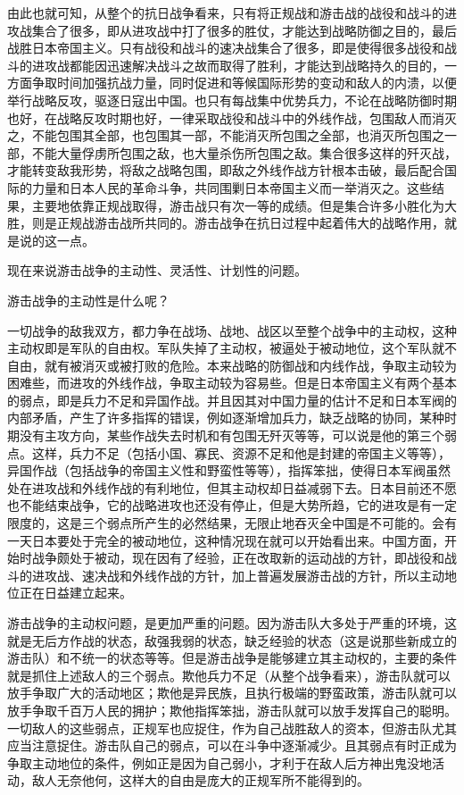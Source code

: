 由此也就可知，从整个的抗日战争看来，只有将正规战和游击战的战役和战斗的进攻战集合了很多，即从进攻战中打了很多的胜仗，才能达到战略防御之目的，最后战胜日本帝国主义。只有战役和战斗的速决战集合了很多，即是使得很多战役和战斗的进攻战都能因迅速解决战斗之故而取得了胜利，才能达到战略持久的目的，一方面争取时间加强抗战力量，同时促进和等候国际形势的变动和敌人的内溃，以便举行战略反攻，驱逐日寇出中国。也只有每战集中优势兵力，不论在战略防御时期也好，在战略反攻时期也好，一律采取战役和战斗中的外线作战，包围敌人而消灭之，不能包围其全部，也包围其一部，不能消灭所包围之全部，也消灭所包围之一部，不能大量俘虏所包围之敌，也大量杀伤所包围之敌。集合很多这样的歼灭战，才能转变敌我形势，将敌之战略包围，即敌之外线作战方针根本击破，最后配合国际的力量和日本人民的革命斗争，共同围剿日本帝国主义而一举消灭之。这些结果，主要地依靠正规战取得，游击战只有次一等的成绩。但是集合许多小胜化为大胜，则是正规战游击战所共同的。游击战争在抗日过程中起着伟大的战略作用，就是说的这一点。

现在来说游击战争的主动性、灵活性、计划性的问题。

游击战争的主动性是什么呢？

一切战争的敌我双方，都力争在战场、战地、战区以至整个战争中的主动权，这种主动权即是军队的自由权。军队失掉了主动权，被逼处于被动地位，这个军队就不自由，就有被消灭或被打败的危险。本来战略的防御战和内线作战，争取主动较为困难些，而进攻的外线作战，争取主动较为容易些。但是日本帝国主义有两个基本的弱点，即是兵力不足和异国作战。并且因其对中国力量的估计不足和日本军阀的内部矛盾，产生了许多指挥的错误，例如逐渐增加兵力，缺乏战略的协同，某种时期没有主攻方向，某些作战失去时机和有包围无歼灭等等，可以说是他的第三个弱点。这样，兵力不足（包括小国、寡民、资源不足和他是封建的帝国主义等等），异国作战（包括战争的帝国主义性和野蛮性等等），指挥笨拙，使得日本军阀虽然处在进攻战和外线作战的有利地位，但其主动权却日益减弱下去。日本目前还不愿也不能结束战争，它的战略进攻也还没有停止，但是大势所趋，它的进攻是有一定限度的，这是三个弱点所产生的必然结果，无限止地吞灭全中国是不可能的。会有一天日本要处于完全的被动地位，这种情况现在就可以开始看出来。中国方面，开始时战争颇处于被动，现在因有了经验，正在改取新的运动战的方针，即战役和战斗的进攻战、速决战和外线作战的方针，加上普遍发展游击战的方针，所以主动地位正在日益建立起来。

游击战争的主动权问题，是更加严重的问题。因为游击队大多处于严重的环境，这就是无后方作战的状态，敌强我弱的状态，缺乏经验的状态（这是说那些新成立的游击队）和不统一的状态等等。但是游击战争是能够建立其主动权的，主要的条件就是抓住上述敌人的三个弱点。欺他兵力不足（从整个战争看来），游击队就可以放手争取广大的活动地区；欺他是异民族，且执行极端的野蛮政策，游击队就可以放手争取千百万人民的拥护；欺他指挥笨拙，游击队就可以放手发挥自己的聪明。一切敌人的这些弱点，正规军也应捉住，作为自己战胜敌人的资本，但游击队尤其应当注意捉住。游击队自己的弱点，可以在斗争中逐渐减少。且其弱点有时正成为争取主动地位的条件，例如正是因为自己弱小，才利于在敌人后方神出鬼没地活动，敌人无奈他何，这样大的自由是庞大的正规军所不能得到的。

